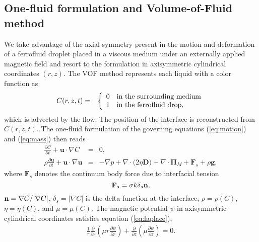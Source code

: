 \subsection{One-fluid formulation and Volume-of-Fluid method}
\label{sec:vof}
We take advantage of the axial symmetry present in the 
motion and deformation of a ferrofluid droplet placed  in 
a viscous medium under an externally applied magnetic field 
and resort to the formulation in axisymmetric cylindrical coordinates $(r,z)$.
The  VOF method represents 
each liquid  with a color function as
\begin{eqnarray}
C(r,z,t) & = & \left\{
\begin{array}{ll}
0 & \mbox{in the surrounding medium}\cr
1 & \mbox{in the ferrofluid drop,}\cr
\end{array}
\right.
\end{eqnarray}
which is advected by the flow.  The position of the interface is 
reconstructed from 
$C(r,z,t)$.  The one-fluid formulation of the governing equations
(\ref{eq:motion}) and (\ref{eq:mass}) then reads
\begin{eqnarray}  
\frac{\partial C}{\partial t}+{\mathbf u}\cdot\nabla C&=&0, \label{eq:vof}\\
\rho \frac{\partial{\mathbf u}}{\partial t}+{\mathbf u}\cdot\nabla {\mathbf u}&=&-\nabla p + 
\nabla\cdot \bigl(2\eta {\mathbf D} \bigr) + \nabla\cdot{\mathbf \Pi}_M + {\mathbf F}_s + \rho {\mathbf g},
\label{eq:motion-vof}
\end{eqnarray}    
where
${\mathbf F}_s$ denotes the continuum body force due to interfacial tension \cite{Brackbill92}
\begin{equation}
{\mathbf F}_s=\sigma k  \delta_s {\bf n}, \label{forces}
\end{equation}
${\bf n} =\nabla C/|\nabla C|$, $\delta_s=|\nabla C|$ is the delta-function at the interface,   
$\rho = \rho(C)$, $\eta = \eta(C)$, and $\mu = \mu (C)$.
The magnetic potential $\psi$ in axisymmetric cylindrical coordinates satisfies equation
(\ref{eq:laplace}),
\begin{eqnarray}
\frac{1}{r}\frac{\partial}{\partial r}\left( \mu r\frac{\partial\psi}{\partial 
r}\right)+\frac 
{\partial}{\partial z} \left(\mu\frac{\partial \psi}{\partial z} \right)=0. 
\label{eq:phi}
\end{eqnarray}

